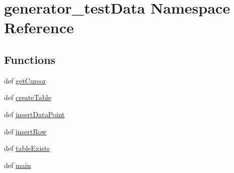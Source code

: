 \hypertarget{namespacegenerator__test_data}{\section{generator\-\_\-test\-Data Namespace Reference}
\label{namespacegenerator__test_data}
}
\subsection*{Functions}
\begin{DoxyCompactItemize}
\item 
def \hyperlink{namespacegenerator__test_data_a4a9465abced90927739acf7a0a515572}{get\-Cursor}
\item 
def \hyperlink{namespacegenerator__test_data_a0e10de95346f6c60ddb26311612e99b4}{create\-Table}
\item 
def \hyperlink{namespacegenerator__test_data_a8aec4184ab35d2a87a24cd5a1f4cdada}{insert\-Data\-Point}
\item 
def \hyperlink{namespacegenerator__test_data_a88f013c3350d785539692899103fa36e}{insert\-Row}
\item 
def \hyperlink{namespacegenerator__test_data_aaa78cde1f9b6b002914b126c91cb1140}{table\-Exists}
\item 
def \hyperlink{namespacegenerator__test_data_a17dd630f225728e09418d808305e93ec}{main}
\end{DoxyCompactItemize}



